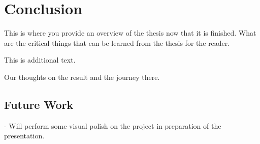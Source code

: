 \chapter{Conclusion}
\label{chap:conclusion}

This is where you provide an overview of the thesis now that it is finished.  What are the critical things that can be learned from the thesis for the reader.

This is additional text.

Our thoughts on the result and the journey there. 

\section{Future Work}
\label{sec:future}
    - Will perform some visual polish on the project in preparation of the presentation.
